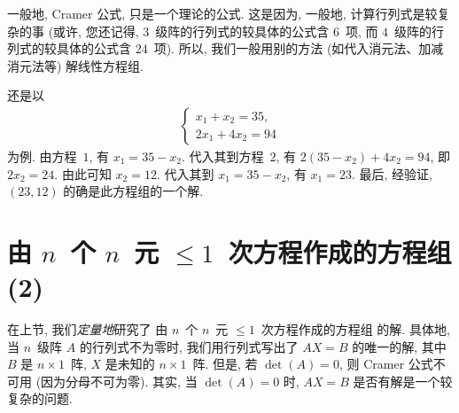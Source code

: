一般地, Cramer 公式, 只是一个理论的公式.
这是因为, 一般地, 计算行列式是较复杂的事
(或许, 您还记得,
\(3\)~级阵的行列式的较具体的公式含 \(6\)~项,
而 \(4\)~级阵的行列式的较具体的公式含 \(24\)~项).
所以, 我们一般用别的方法
(如代入消元法、加减消元法等)
解线性方程组.

还是以
\begin{align*}
    \begin{cases}
        x_1 + x_2 = 35, \\
        2x_1 + 4x_2 = 94
    \end{cases}
\end{align*}
为例.
由方程~\(1\), 有 \(x_1 = 35 - x_2\).
代入其到方程~\(2\), 有
\(2(35 - x_2) + 4x_2 = 94\),
即 \(2x_2 = 24\).
由此可知 \(x_2 = 12\).
代入其到 \(x_1 = 35 - x_2\),
有 \(x_1 = 23\).
最后, 经验证, \((23, 12)\) 的确是此方程组的一个解.

\KunAsteriskoEnEnhavtabelo

\section{\texorpdfstring{由 \(n\)~个 \(n\)~元
      \({\leq} 1\)~次方程作成的方程组 (2)}%
  {由 n 个 n 元 ≤1 次方程作成的方程组 (2)}}

\maldevigalegajxo

在上节, 我们\emph{定量地}研究了%
由 \(n\)~个 \(n\)~元 \({\leq} 1\)~次方程作成的方程组%
的解.
具体地, 当 \(n\)~级阵 \(A\) 的行列式不为零时,
我们用行列式写出了 \(AX = B\) 的唯一的解,
其中
\(B\) 是 \(n \times 1\)~阵,
\(X\) 是未知的 \(n \times 1\)~阵.
但是, 若 \(\det {(A)} = 0\),
则 Cramer 公式不可用
(因为分母不可为零).
其实, 当 \(\det {(A)} = 0\) 时,
\(AX = B\) 是否有解是一个较复杂的问题.

